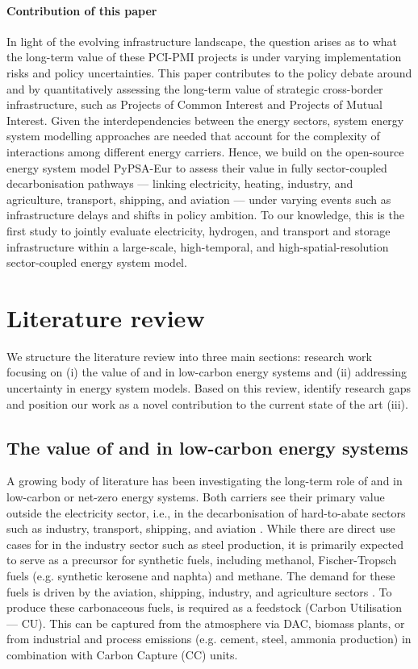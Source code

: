 \documentclass[final,5p,times,twocolumn,sort&compress]{elsarticle}
\begin{document}
\paragraph{Contribution of this paper}
In light of the evolving infrastructure landscape, the question arises as to what the long-term value of these PCI-PMI projects is under varying implementation risks and policy uncertainties.
This paper contributes to the policy debate around  and  by quantitatively assessing the long-term value of strategic cross-border infrastructure, such as Projects of Common Interest and Projects of Mutual Interest. Given the interdependencies between the energy sectors, system energy system modelling approaches are needed that account for the complexity of interactions among different energy carriers. Hence, we build on the open-source energy system model PyPSA-Eur to assess their value in fully sector-coupled decarbonisation pathways --- linking electricity, heating, industry, and agriculture, transport, shipping, and aviation --- under varying events such as infrastructure delays and shifts in policy ambition. To our knowledge, this is the first study to jointly evaluate electricity, hydrogen, and  transport and storage infrastructure within a large-scale, high-temporal, and high-spatial-resolution sector-coupled energy system model.

\section{Literature review}
\label{sec:literature_review}
We structure the literature review into three main sections: research work focusing on (i) the value of  and  in low-carbon energy systems and (ii) addressing uncertainty in energy system models. Based on this review, identify research gaps and position our work as a novel contribution to the current state of the art (iii).

\subsection{The value of  and  in low-carbon energy systems} 
A growing body of literature has been investigating the long-term role of  and  in low-carbon or net-zero energy systems. Both carriers see their primary value outside the electricity sector, i.e., in the decarbonisation of hard-to-abate sectors such as industry, transport, shipping, and aviation \cite{reigstadMovingLowcarbonHydrogen2022}. While there are direct use cases for  in the industry sector such as steel production, it is primarily expected to serve as a precursor for synthetic fuels, including methanol, Fischer-Tropsch fuels (e.g. synthetic kerosene and naphta) and methane. The demand for these fuels is driven by the aviation, shipping, industry, and agriculture sectors \cite{neumannPotentialRoleHydrogen2023}. To produce these carbonaceous fuels,  is required as a feedstock (Carbon Utilisation --- CU). This  can be captured from the atmosphere via DAC, biomass plants, or from industrial and process emissions (e.g. cement, steel, ammonia production) in combination with Carbon Capture (CC) units.
\end{document}
